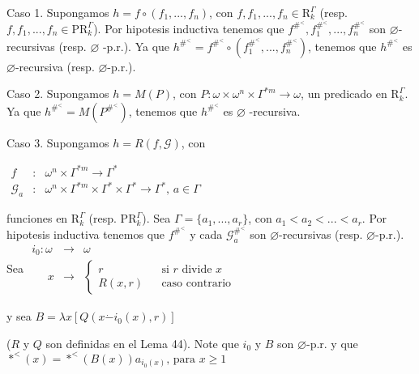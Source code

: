 Caso 1. Supongamos \(h=f\circ (f_{1},...,f_{n})\), con \(f,f_{1},...,f_{n}\in \mathrm{R}_{k}^{\Gamma }\) (resp. \(f,f_{1},...,f_{n}\in \mathrm{PR} _{k}^{\Gamma }\)). Por hipotesis inductiva tenemos que \(f^{\#^{< }},f_{1}^{ \#^{< }},...,f_{n}^{\#^{< }}\) son \(\varnothing \)-recursivas (resp. \(\varnothing \) -p.r.). Ya que \(h^{\#^{< }}=f^{\#^{< }}\circ \left( f_{1}^{\#^{< }},...,f_{n}^{\#^{< }}\right) \), tenemos que \(h^{\#^{< }}\) es \( \varnothing \)-recursiva (resp. \(\varnothing \)-p.r.).

Caso 2. Supongamos \(h=M(P)\), con \(P:\omega \times \omega ^{n}\times \Gamma ^{\ast m}\rightarrow \omega \), un predicado en \(\mathrm{R}_{k}^{\Gamma }\). Ya que \(h^{\#^{< }}=M(P^{\#^{< }})\), tenemos que \(h^{\#^{< }}\) es \(\varnothing \) -recursiva.

Caso 3. Supongamos \(h=R(f,\mathcal{G})\), con

\(\displaystyle \begin{array}{rcl} f & :& \omega ^{n}\times \Gamma ^{\ast m}\rightarrow \Gamma ^{\ast } \\ \mathcal{G}_{a} & :& \omega ^{n}\times \Gamma ^{\ast m}\times \Gamma ^{\ast }\times \Gamma ^{\ast }\rightarrow \Gamma ^{\ast }\text{, }a\in \Gamma \end{array} \)

funciones en \(\mathrm{R}_{k}^{\Gamma }\) (resp. \(\mathrm{PR}_{k}^{\Gamma }\)). Sea \(\Gamma =\{a_{1},...,a_{r}\}\), con \(a_{1}< a_{2}< ...< a_{r}\). Por hipotesis inductiva tenemos que \(f^{\#^{< }}\) y cada \(\mathcal{G} _{a}^{\#^{< }} \) son \(\varnothing \)-recursivas (resp. \(\varnothing \)-p.r.). Sea
\(\displaystyle \begin{array}{lll} i_{0}:\omega & \rightarrow & \omega \\ \;\;\;\;\;x & \rightarrow & \left\{ \begin{array}{lll} r & & \text{si }r\text{ divide }x \\ R(x,r) & & \text{caso contrario} \end{array} \right. \end{array} \)

y sea
\(\displaystyle B=\lambda x\left[ Q(x\dot{-}i_{0}(x),r)\right] \)

(\(R\) y \(Q\) son definidas en el Lema 44). Note que \(i_{0}\) y \(B\) son \(\varnothing \)-p.r. y que
\(\displaystyle \ast ^{< }(x)=\ast ^{< }(B(x))a_{i_{0}(x)}\text{, para }x\geq 1 \)

